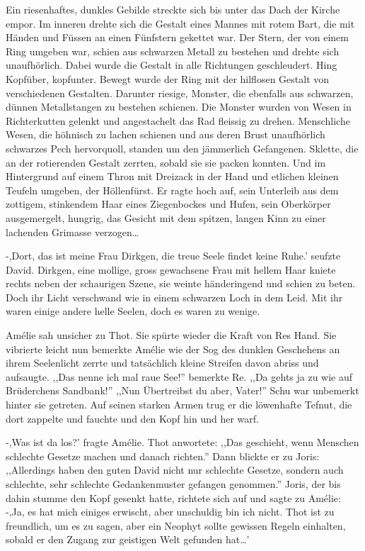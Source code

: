 \documentclass[11pt,titlepage,a5paper]{book}
\begin{document}
Ein riesenhaftes, dunkles Gebilde streckte sich bis unter das Dach der Kirche empor. Im inneren drehte sich die Gestalt eines Mannes mit rotem Bart, die mit Händen und Füssen an einen Fünfstern gekettet war. Der Stern, der von einem Ring umgeben war, schien aus schwarzen Metall zu bestehen und drehte sich unaufhörlich. Dabei wurde die Gestalt in alle Richtungen geschleudert. Hing Kopfüber, kopfunter. Bewegt wurde der Ring mit der hilflosen Gestalt von verschiedenen Gestalten. Darunter riesige, Monster, die ebenfalls aus schwarzen, dünnen Metallstangen zu bestehen schienen. Die Monster wurden von Wesen in Richterkutten gelenkt und angestachelt das Rad fleissig zu drehen. Menschliche Wesen, die höhnisch zu lachen schienen und aus deren Brust unaufhörlich schwarzes Pech hervorquoll, standen um den jämmerlich Gefangenen. Sklette, die an der rotierenden Gestalt zerrten, sobald sie sie packen konnten. Und im Hintergrund auf einem Thron mit Dreizack in der Hand und etlichen kleinen Teufeln umgeben, der Höllenfürst. Er ragte hoch auf, sein Unterleib aus dem zottigem, stinkendem Haar eines Ziegenbockes und Hufen, sein Oberkörper ausgemergelt, hungrig, das Gesicht mit dem spitzen, langen Kinn zu einer lachenden Grimasse verzogen\dots

-,Dort, das ist meine Frau Dirkgen, die treue Seele findet keine Ruhe.' seufzte David. Dirkgen, eine mollige, gross gewachsene Frau mit hellem Haar kniete rechts neben der schaurigen Szene, sie weinte händeringend und schien zu beten. Doch ihr Licht verschwand wie in einem schwarzen Loch in dem Leid. Mit ihr waren einige andere helle Seelen, doch es waren zu wenige.

Amélie sah unsicher zu Thot. Sie spürte wieder die Kraft von Res Hand. Sie vibrierte leicht nun bemerkte Amélie wie der Sog des dunklen Geschehens an ihrem Seelenlicht zerrte und tatsächlich kleine Streifen davon abriss und aufsaugte. ,,Das nenne ich mal raue See!'' bemerkte Re. ,,Da gehts ja zu wie auf Brüderchens Sandbank!'' ,,Nun Übertreibst du aber, Vater!'' Schu war unbemerkt hinter sie getreten. Auf seinen starken Armen trug er die löwenhafte Tefnut, die dort zappelte und fauchte und den Kopf hin und her warf.

-,Was ist da los?' fragte Amélie. Thot anwortete: ,,Das geschieht, wenn Menschen schlechte Gesetze machen und danach richten.'' Dann blickte er zu Joris: ,,Allerdings haben den guten David nicht nur schlechte Gesetze, sondern auch schlechte, sehr schlechte Gedankenmuster gefangen genommen.'' Joris, der bis dahin stumme den Kopf gesenkt hatte, richtete sich auf und sagte zu Amélie: -,Ja, es hat mich einiges erwischt, aber unschuldig bin ich nicht. Thot ist zu freundlich, um es zu sagen, aber ein Neophyt sollte gewissen Regeln einhalten, sobald er den Zugang zur geistigen Welt gefunden hat\dots'
\end{document}
